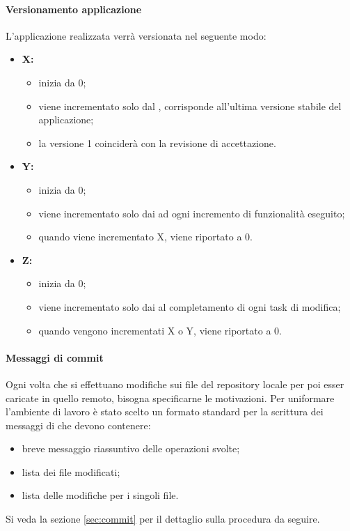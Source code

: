 		\paragraph{Versionamento applicazione}
		L'applicazione realizzata verrà versionata nel seguente modo:
		\begin{itemize}
			\item \textbf{X:}
			\begin{itemize}
				\item inizia da 0;
				\item viene incrementato solo dal \responsabilediprogetto, corrisponde all'ultima versione stabile del applicazione; 
				\item la versione 1 coinciderà con la revisione di accettazione.
			\end{itemize}
			\item \textbf{Y:}
			\begin{itemize}
				\item inizia da 0;
				\item viene incrementato solo dai \verificatori{} ad ogni incremento di funzionalità eseguito;
				\item quando viene incrementato X, viene riportato a 0.
			\end{itemize}
			\item \textbf{Z:}
			\begin{itemize}
				\item inizia da 0;
				\item viene incrementato solo dai \programmatori{} al completamento di ogni task di modifica;
				\item quando vengono incrementati X o Y, viene riportato a 0.
			\end{itemize}
		\end{itemize}
  
        \paragraph{Messaggi di commit}
        Ogni volta che si effettuano modifiche sui file del repository locale per poi esser caricate in quello remoto, bisogna specificarne le motivazioni. Per uniformare l'ambiente di lavoro è stato scelto un formato standard per la scrittura dei messaggi di  che devono contenere:
        \begin{itemize}
            \item breve messaggio riassuntivo delle operazioni svolte;
            \item lista dei file modificati;
            \item lista delle modifiche per i singoli file.
        \end{itemize}
        Si veda la sezione \ref{sec:commit} per il dettaglio sulla procedura da seguire.
  

